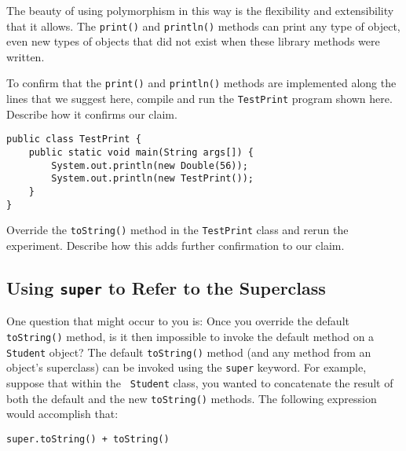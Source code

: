 The beauty of using polymorphism in this way is the flexibility and
extensibility that it allows.  The {\tt print()} and {\tt println()}
methods can print any type of object, even new types of objects that
did not exist when these library methods were written.

\begin{SSTUDY}

\item  To confirm that the {\tt print()} and {\tt println()} methods
are implemented along the lines that we suggest here, compile and run
the {\tt TestPrint} program shown here. Describe how it confirms our claim.

\begin{jjjlisting}
\begin{lstlisting}
public class TestPrint {
    public static void main(String args[]) {
        System.out.println(new Double(56));
        System.out.println(new TestPrint());
    }
}
\end{lstlisting}
\end{jjjlisting}

\item Override the {\tt toString()} method in the {\tt TestPrint}
class and rerun the experiment. Describe how this adds further
confirmation to our claim.

\end{SSTUDY}


\subsection{Using {\tt super} to Refer to the Superclass}

One question that might occur to you is: Once you override the default
{\tt toString()} method, is it then impossible to invoke the default
method on a {\tt Student} object?  The default {\tt toString()} method
(and any method from an object's superclass) can be invoked using the
{\tt super} keyword.  For example, suppose that within the {\tt
Student} class, you wanted to concatenate the result of both the
default and the new {\tt toString()} methods. The following expression
would accomplish that:

\begin{jjjlisting}
\begin{lstlisting}
super.toString() + toString()
\end{lstlisting}
\end{jjjlisting}

